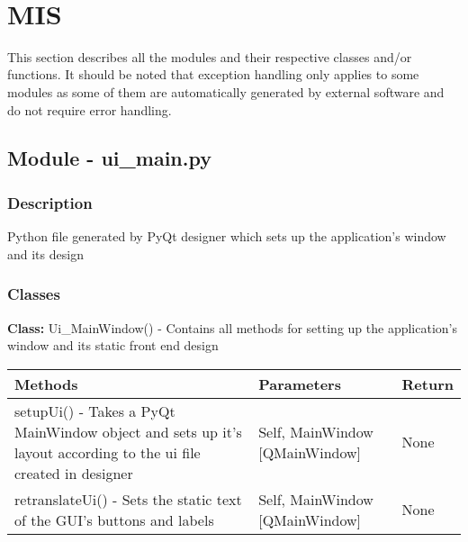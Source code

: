 \documentclass[12pt, titlepage]{article}
\begin{document}
~\newpage

\section{MIS } \label{Module} 
This section describes all the modules and their respective classes and/or functions. It should be noted that exception handling only applies to some
modules as some of them are automatically generated by external software and do not require error handling.


  \subsection{Module - ui\_main.py}

  \subsubsection{Description}
  Python file generated by PyQt designer which sets up the application’s window and its design

  \subsubsection{Classes}
  \textbf{Class:} Ui\_MainWindow() - Contains all methods for setting up the application’s window and its static front end design \\

    \noindent \begin{tabular}{| p{} | p{}| p{}|}
      \hline
      \rowcolor[gray]{0.9}
      Methods & Parameters & Return\\
      \hline
      setupUi() - Takes a PyQt MainWindow object and sets up it’s layout according to the ui file created in designer &Self, MainWindow [QMainWindow] & None \\
      \hline
      retranslateUi() - Sets the static text of the GUI’s buttons and labels & Self, MainWindow [QMainWindow] & None \\
      \hline
    \end{tabular}


\end{document}
